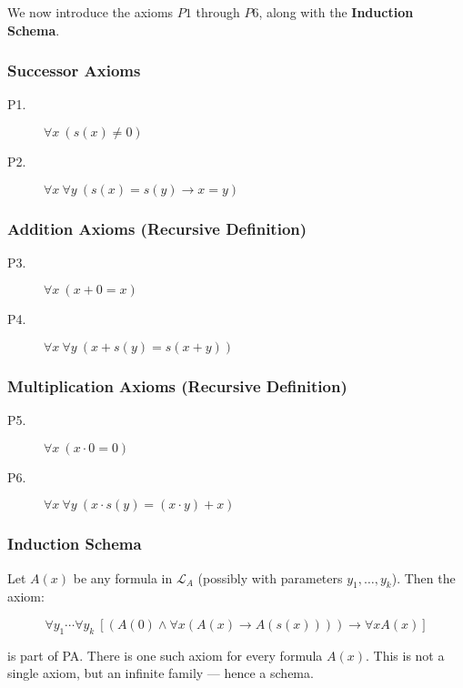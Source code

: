 \documentclass[12pt]{article}
\begin{document}
We now introduce the axioms \( P1 \) through \( P6 \), along with the \textbf{Induction Schema}.

\subsubsection*{Successor Axioms}

\begin{description}
  \item[P1.] \( \forall x\ (s(x) \neq 0) \)
  \item[P2.] \( \forall x\ \forall y\ (s(x) = s(y) \rightarrow x = y) \)
\end{description}

\subsubsection*{Addition Axioms (Recursive Definition)}

\begin{description}
  \item[P3.] \( \forall x\ (x + 0 = x) \)
  \item[P4.] \( \forall x\ \forall y\ (x + s(y) = s(x + y)) \)
\end{description}

\subsubsection*{Multiplication Axioms (Recursive Definition)}

\begin{description}
  \item[P5.] \( \forall x\ (x \cdot 0 = 0) \)
  \item[P6.] \( \forall x\ \forall y\ (x \cdot s(y) = (x \cdot y) + x) \)
\end{description}

\subsubsection*{Induction Schema}

Let \( A(x) \) be any formula in \( \mathcal{L}_A \) (possibly with parameters \( y_1, \dots, y_k \)). Then the axiom:

\[
\forall y_1 \cdots \forall y_k\ \left[(A(0) \wedge \forall x (A(x) \rightarrow A(s(x)))) \rightarrow \forall x A(x)\right]
\]

is part of PA. There is one such axiom for every formula \( A(x) \). This is not a single axiom, but an infinite family — hence a schema.
\end{document}
